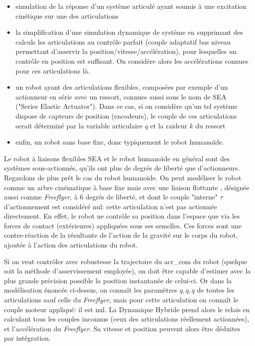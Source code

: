 \documentclass{report}
\begin{document}
\begin{itemize}
\item simulation de la réponse d'un système articulé ayant soumis à une excitation cinétique sur une des articulations
\item la simplification d'une simulation dynamique de système en supprimant des calculs les articulations au contrôle parfait (couple adaptatif bas niveau permettant d'asservir la position/vitesse/accélération), pour lesquelles un contrôle en position est suffisant. On considère alors les accélérations connues pour ces articulations là.
\item un robot ayant des articulations flexibles, composées par exemple d'un actionneur en série avec un ressort, connues aussi sous le nom de SEA ("Series Elastic Actuator"). Dans ce cas, si on considère qu'un tel système dispose de capteurs de position (encodeurs), le couple de ces articulations serait déterminé par la variable articulaire $q$ et la raideur $k$ du ressort
\item enfin, un robot sans base fixe, donc typiquement le robot humanoïde.
\end{itemize}

Le robot à liaisons flexibles SEA et le robot humanoïde en général sont des systèmes sous-actionnés, \cad qu'ils ont plus de degrés de liberté que d'actionneurs. Regardons de plus prêt le cas du robot humanoïde. On peut modéliser le robot comme un arbre cinématique à base fixe mais avec une liaison flottante \cite[chap.9 p171]{bib_featherstone}, désignée aussi comme \emph{Freeflyer}, à 6 degrés de liberté, et dont le couple "interne" $\tau$ d'actionnement est considéré nul: cette articulation n'est pas actionnée directement. En effet, le robot ne contrôle sa position dans l'espace que via les forces de contact (extérieures) appliquées sous ses semelles. Ces forces sont une contre-réaction de la résultante de l'action de la gravité sur le corps du robot, ajoutée à l'action des articulations du robot.

Si on veut contrôler avec robustesse la trajectoire du \gls{acr_com} du robot (quelque soit la méthode d'asservissement employée), on doit être capable d'estimer avec la plus grande précision possible la position instantanée de celui-ci. Or dans la modélisation énoncée ci-dessus, on connaît les paramètres $q, \dot{q}, \ddot{q}$ de toutes les articulations sauf celle du \emph{Freeflyer}, mais pour cette articulation on connaît le couple moteur appliqué: il est nul. La Dynamique Hybride prend alors le relais en calculant tous les couples inconnus (ceux des articulations réellement actionnées), et l'accélération du \emph{Freeflyer}. Sa vitesse et position peuvent alors être déduites par intégration.
\end{document}
